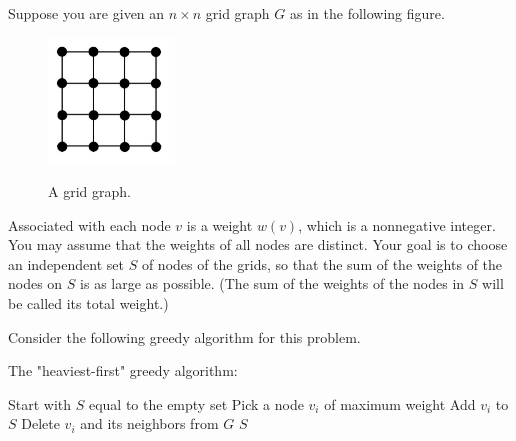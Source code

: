 \documentclass[addpoints]{exam}
\begin{document}
\begin{questions}
\begin{parts}
\begin{solution}
\end{solution}
  
  
\end{parts}





   Suppose you are given an $n\times n$ grid graph $G$ as in the following figure.

\begin{figure}[H]
  \centering
  \includegraphics[width=0.3\textwidth]{fig1.pdf}\\
  \caption{A grid graph.}
\end{figure}

Associated with each node $v$ is a weight $w(v)$, which is a nonnegative integer. You may assume that the weights of all nodes are distinct.
Your goal is to choose an independent set $S$ of nodes of the grids, so that the sum of the weights of the nodes on $S$ is as large as possible.
(The sum of the weights of the nodes in $S$ will be called its total weight.)


Consider the following greedy algorithm for this problem.
\begin{algorithm*} %
\caption{The "heaviest-first" greedy algorithm:} %
\begin{algorithmic} %
\STATE Start with $S$ equal to the empty set
\STATE Pick a node $v_i$ of maximum weight
\STATE Add $v_i$ to $S$
\STATE Delete $v_i$ and its neighbors from $G$
\ENDWHILE
\RETURN $S$
\end{algorithmic}
\end{algorithm*}



  \begin{parts}

\end{parts}
\end{questions}
\end{document}
